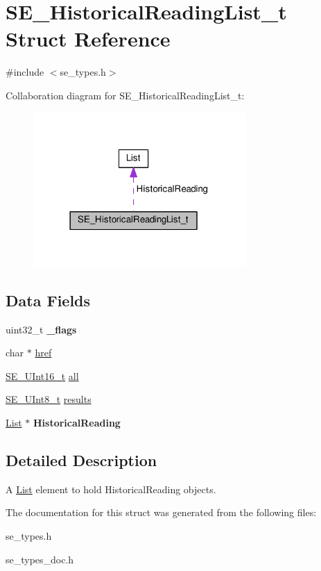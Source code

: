 \hypertarget{structSE__HistoricalReadingList__t}{}\section{S\+E\+\_\+\+Historical\+Reading\+List\+\_\+t Struct Reference}
\label{structSE__HistoricalReadingList__t}


{\ttfamily \#include $<$se\+\_\+types.\+h$>$}



Collaboration diagram for S\+E\+\_\+\+Historical\+Reading\+List\+\_\+t\+:\nopagebreak
\begin{figure}[H]
\begin{center}
\leavevmode
\includegraphics[width=230pt]{structSE__HistoricalReadingList__t__coll__graph}
\end{center}
\end{figure}
\subsection*{Data Fields}
\begin{DoxyCompactItemize}
\item 
uint32\+\_\+t {\bfseries \+\_\+flags}
\item 
char $\ast$ \hyperlink{group__HistoricalReadingList_gadb13f23b1edd9e43645c4be5ca2a99d8}{href}
\item 
\hyperlink{group__UInt16_gac68d541f189538bfd30cfaa712d20d29}{S\+E\+\_\+\+U\+Int16\+\_\+t} \hyperlink{group__HistoricalReadingList_gac457b74ad4a78aafd138081d24cf5907}{all}
\item 
\hyperlink{group__UInt8_gaf7c365a1acfe204e3a67c16ed44572f5}{S\+E\+\_\+\+U\+Int8\+\_\+t} \hyperlink{group__HistoricalReadingList_gae4f835b29c288b7d9ea0db353e3a7528}{results}
\item 
\hyperlink{structList}{List} $\ast$ {\bfseries Historical\+Reading}
\end{DoxyCompactItemize}


\subsection{Detailed Description}
A \hyperlink{structList}{List} element to hold Historical\+Reading objects. 

The documentation for this struct was generated from the following files\+:\begin{DoxyCompactItemize}
\item 
se\+\_\+types.\+h\item 
se\+\_\+types\+\_\+doc.\+h\end{DoxyCompactItemize}
